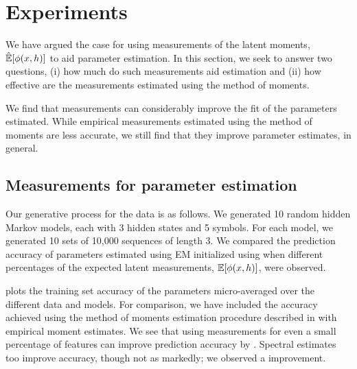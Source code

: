 \section{Experiments} \label{sec:experiments}

We have argued the case for using measurements of the latent moments,
$\hat{\mathbb{E}}[\phi(x,h)]$ to aid parameter estimation. In this section, we
seek to answer two questions, 
(i) how much do such measurements aid
estimation and 
(ii) how effective are the measurements estimated using the
method of moments.

We find that measurements can considerably improve the fit of the
parameters estimated. 
While empirical measurements estimated using the
method of moments are less accurate, we still find that they improve
parameter estimates, in general.

\subsection{Measurements for parameter estimation}

Our generative process for the data is as follows.
We generated 10 random hidden Markov models, each with 3 hidden states and 5 symbols. 
For each model, we generated 10 sets of 10,000 sequences of length 3.
We compared the prediction accuracy of parameters estimated using EM initialized using  when different percentages of the expected latent measurements, $\mathbb{E}[\phi(x,h)]$, were observed. 


 plots the training set accuracy of the parameters micro-averaged over the different data and models.
For comparison, we have included the accuracy achieved using the method of moments estimation procedure described in  with empirical moment estimates. 
We see that using measurements for even a small percentage of features can improve prediction accuracy by . Spectral estimates too improve accuracy, though not as markedly; we observed a   improvement.


